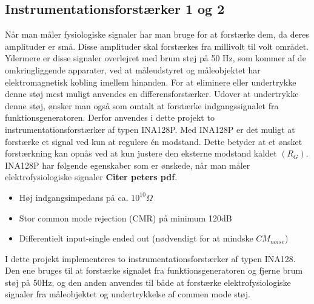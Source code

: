  \pagebreak

\subsection{Instrumentationsforstærker  1 og 2}
Når man måler fysiologiske signaler har man bruge for at forstærke dem, da deres amplituder er små. Disse amplituder skal forstærkes fra millivolt  til volt området. Ydermere er disse signaler overlejret med brum støj på 50 Hz, som kommer af de omkringliggende apparater, ved at måleudstyret og måleobjektet har elektromagnetisk kobling imellem hinanden. For at eliminere eller undertrykke denne støj mest muligt anvendes en differensforstærker. Udover at undertrykke denne støj, ønsker man også som omtalt at forstærke indgangssignalet fra funktionsgeneratoren. Derfor anvendes i dette projekt to instrumentationsforstærker af typen INA128P. Med INA128P er det muligt at forstærke et signal ved kun at regulere én modstand. Dette betyder at et ønsket forstærkning kan opnås ved at kun justere den eksterne modstand kaldet $(R_G)$. INA128P har følgende egenskaber som er ønskede, når man måler elektrofysiologiske signaler \textbf{Citer peters pdf}. 

\begin{itemize}
\item 	Høj indgangsimpedans på ca. $10^{10} \Omega $
\item	Stor common mode rejection (CMR) på minimum 120dB
\item 	Differentielt input-single ended out (nødvendigt for at mindske $CM_{noise}$)
\end{itemize}

I dette projekt implementeres to instrumentationsforstærker af typen INA128. Den ene bruges til at forstærke signalet fra funktionsgeneratoren og fjerne brum støj på 50Hz, og den anden anvendes til både at forstærke elektrofysiologiske signaler fra måleobjektet og undertrykkelse af commen mode støj.  

